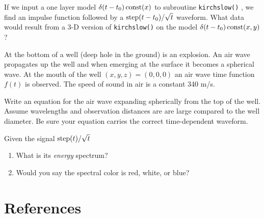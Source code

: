 {\begin{exer}
\item	If we input a one layer model $\delta(t-t_0)\,{\rm const}(x)$
	to subroutine \texttt{kirchslow()} ,
	we find an impulse function followed by a
	${\rm step}(t-t_0)/\sqrt{t}$ waveform.
	What data would result from
	a 3-D version of {\tt kirchslow()}
	on the model $\delta(t-t_0)\,{\rm const}(x,y)$?
\item   At the bottom of a well (deep hole in the ground) is an explosion.
	An air wave propagates up the well and when emerging at the surface
	it becomes a spherical wave.
	At the mouth of the well
	$(x,y,z)=(0,0,0)$ an air wave time function $f(t)$ is observed.
	The speed of sound in air is a constant 340 m/s.
	\par
	Write an equation
	for the air wave
	expanding spherically from the top of the well.
	Assume wavelengths and observation distances are 
	are large compared to the well diameter.
	Be sure your equation carries the correct time-dependent waveform.
\item
	Given the signal ${\rm step}(t)/\sqrt{t}$
	\begin{enumerate}
	\item What is its {\em  energy} spectrum?
	\item Would you say the spectral color is red, white, or blue?
	\end{enumerate}
\end{exer}

}%

\section{References}











































